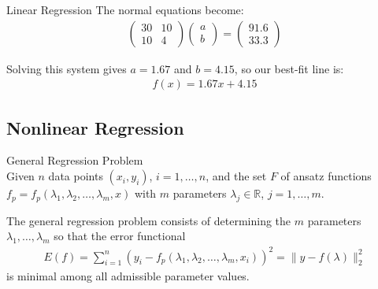 \begin{example2}{Linear Regression}
The normal equations become:
\begin{align*}
\begin{pmatrix} 30 & 10 \\ 10 & 4 \end{pmatrix} \begin{pmatrix} a \\ b \end{pmatrix} = \begin{pmatrix} 91.6 \\ 33.3 \end{pmatrix}
\end{align*}

Solving this system gives $a = 1.67$ and $b = 4.15$, so our best-fit line is:
\begin{align*}
f(x) = 1.67x + 4.15
\end{align*}
\end{example2}

\subsection{Nonlinear Regression}

\begin{definition}{General Regression Problem}\\
Given $n$ data points $(x_i, y_i)$, $i=1,\ldots,n$, and the set $F$ of ansatz functions $f_p = f_p(\lambda_1, \lambda_2, \ldots, \lambda_m, x)$ with $m$ parameters $\lambda_j \in \mathbb{R}$, $j=1,\ldots,m$.

The general regression problem consists of determining the $m$ parameters $\lambda_1,\ldots,\lambda_m$ so that the error functional
\begin{align*}
E(f) = \sum_{i=1}^{n}(y_i - f_p(\lambda_1, \lambda_2, \ldots, \lambda_m, x_i))^2 = \|y - f(\lambda)\|_2^2
\end{align*}
is minimal among all admissible parameter values.
\end{definition}

